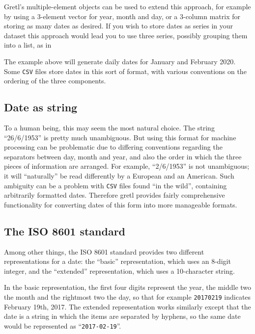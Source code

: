 Gretl's multiple-element objects can be used to extend this approach,
for example by using a 3-element vector for year, month and day, or a
3-column matrix for storing as many dates as desired. If you wish to
store dates as series in your dataset this approach would lead you to
use three series, possibly grouping them into a list, as in
The example above will generate daily dates for January and February
2020. Some \texttt{CSV} files store dates in this sort of format, with
various conventions on the ordering of the three components.

\subsection{Date as string}
\label{sec:cal-generic-string}

To a human being, this may seem the most natural choice.  The string
``26/6/1953'' is pretty much unambiguous. But using this format for
machine processing can be problematic due to differing conventions
regarding the separators between day, month and year, and also the
order in which the three pieces of information are arranged.  For
example, ``2/6/1953'' is not unambiguous; it will ``naturally'' be
read differently by a European and an American. Such ambiguity can be
a problem with \texttt{CSV} files found ``in the wild'', containing
arbitrarily formatted dates. Therefore gretl provides fairly
comprehensive functionality for converting dates of this form into
more manageable formats.

\subsection{The ISO 8601 standard}
\label{sec:cal-ISO8601}

Among other things, the ISO 8601 standard provides two different
representations for a date: the ``basic'' representation, which uses
an 8-digit integer, and the ``extended'' representation, which uses a
10-character string.

In the basic representation, the first four digits represent the year,
the middle two the month and the rightmost two the day, so that for
example \texttt{20170219} indicates February 19th, 2017. The extended
representation works similarly except that the date is a string in
which the items are separated by hyphens, so the same date would be
represented as ``\texttt{2017-02-19}''.

